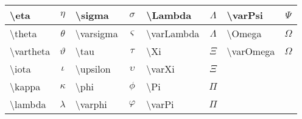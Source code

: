 \begin{center}
\begin{tabular}{|l|c||l|c|l|c||l|c|}
\textbackslash eta          & $\eta$            & \textbackslash sigma        & $\sigma$    & \textbackslash Lambda       & $\Lambda$       & \textbackslash varPsi       & $\varPsi$       \\ \hline
\textbackslash theta        & $\theta$          & \textbackslash varsigma     & $\varsigma$ & \textbackslash varLambda    & $\varLambda$    & \textbackslash Omega        & $\Omega$        \\ \hline
\textbackslash vartheta     & $\vartheta$       & \textbackslash tau          & $\tau$      & \textbackslash Xi           & $\Xi$           & \textbackslash varOmega     & $\varOmega$     \\ \hline
\textbackslash iota         & $\iota$           & \textbackslash upsilon      & $\upsilon$  & \textbackslash varXi        & $\varXi$        &                             &                 \\ \hline
\textbackslash kappa        & $\kappa$          & \textbackslash phi          & $\phi$      & \textbackslash Pi           & $\Pi$           &                             &                 \\ \hline
\textbackslash lambda       & $\lambda$         & \textbackslash varphi       & $\varphi$   & \textbackslash varPi        & $\varPi$        &                             &                 \\ \hline
\end{tabular}
\end{center}



